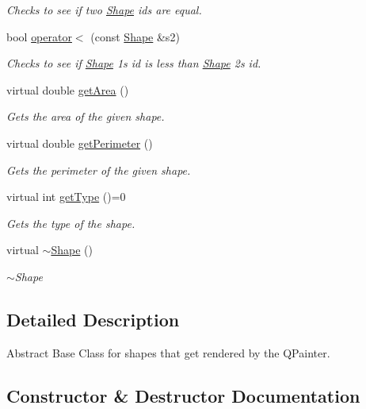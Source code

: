 \begin{DoxyCompactItemize}
\begin{DoxyCompactList}\small\item\em Checks to see if two \hyperlink{classShape}{Shape} ids are equal. \end{DoxyCompactList}\item 
bool \hyperlink{classShape_a0d2732ef366fa236a534351f6a0d96e5}{operator$<$} (const \hyperlink{classShape}{Shape} \&s2)
\begin{DoxyCompactList}\small\item\em Checks to see if \hyperlink{classShape}{Shape} 1\textquotesingle{}s id is less than \hyperlink{classShape}{Shape} 2\textquotesingle{}s id. \end{DoxyCompactList}\item 
virtual double \hyperlink{classShape_ac29f8bce0d038c84470028c6819a79ab}{get\+Area} ()
\begin{DoxyCompactList}\small\item\em Gets the area of the given shape. \end{DoxyCompactList}\item 
virtual double \hyperlink{classShape_a391744b6bce96df044139dcbd1ae0aa8}{get\+Perimeter} ()
\begin{DoxyCompactList}\small\item\em Gets the perimeter of the given shape. \end{DoxyCompactList}\item 
virtual int \hyperlink{classShape_a3d15adf2a1d746928f9be98105096eda}{get\+Type} ()=0
\begin{DoxyCompactList}\small\item\em Gets the type of the shape. \end{DoxyCompactList}\item 
virtual \hyperlink{classShape_ac3b9fc48965274893f25b18aa14ba665}{$\sim$\+Shape} ()
\begin{DoxyCompactList}\small\item\em $\sim$\+Shape \end{DoxyCompactList}\end{DoxyCompactItemize}


\subsection{Detailed Description}
Abstract Base Class for shapes that get rendered by the Q\+Painter. 

\subsection{Constructor \& Destructor Documentation}

